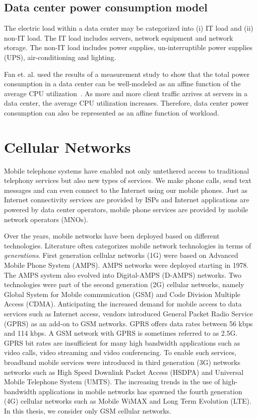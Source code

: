 \subsection{Data center power consumption model} 
The electric load within a data center may be categorized into (i) IT load and (ii) non-IT load. The IT load includes servers, network equipment and network storage. The non-IT load includes power supplies, un-interruptible power supplies (UPS), air-conditioning and lighting. 

Fan et. al. used the results of a measurement study to show that the total power consumption in a data center can be well-modeled as an affine function of the average CPU utilization~\cite{Fan:power:ICSA:2007}. As more and more client traffic arrives at servers in a data center, the average CPU utilization increases. Therefore, data center power consumption can also be represented as an affine function of workload. 

\section{Cellular Networks} %
Mobile telephone systems have enabled not only untethered access to traditional telephony services but also new types of services. We make phone calls, send text messages and can even connect to the Internet using our mobile phones. Just as Internet connectivity services are provided by ISPs and Internet applications are powered by data center operators, mobile phone services are provided by mobile network operators (MNOs).  

Over the years, mobile networks have been deployed based on different technologies. Literature often categorizes mobile network technologies in terms of \textit{generations}. First generation cellular networks (1G) were based on Advanced Mobile Phone System (AMPS). AMPS networks were deployed starting in 1978. The AMPS system also evolved into Digital-AMPS (D-AMPS) networks. Two technologies were part of the second generation (2G) cellular networks, namely Global System for Mobile communication (GSM) and Code Division Multiple Access (CDMA). Anticipating the increased demand for mobile access to data services such as Internet access, vendors introduced General Packet Radio Service (GPRS) as an add-on to GSM networks. GPRS offers data rates between 56 kbps and 114 kbps. A GSM network with GPRS is sometimes referred to as 2.5G. GPRS bit rates are insufficient for many high bandwidth applications such as video calls, video streaming and video conferencing. To enable such services, broadband mobile services were introduced in third generation (3G) networks networks such as High Speed Downlink Packet Access (HSDPA) and Universal Mobile Telephone System (UMTS). The increasing trends in the use of high-bandwidth applications in mobile networks has spawned the fourth generation (4G) cellular networks such as Mobile WiMAX and Long Term Evolution (LTE). In this thesis, we consider only GSM cellular networks.

